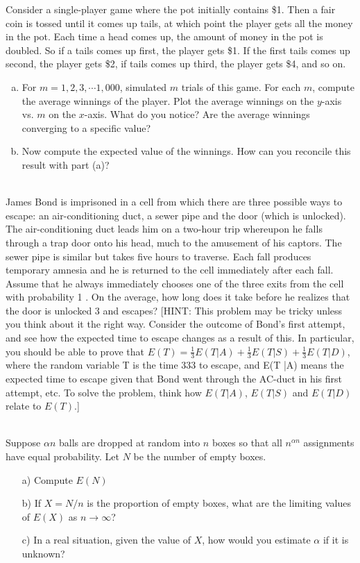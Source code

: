\documentclass[]{article}
\begin{document}
\begin{qunlist}

Consider a single-player game where the pot initially contains \$1. Then a fair coin is tossed until it comes up tails, at which point the player gets all the money in the pot. Each time a head comes up, the amount of money in the pot is doubled.  So if a tails comes up first, the player gets \$1.  If the first tails comes up second, the player gets \$2, if tails comes up third, the player gets \$4, and so on.

\begin{enumerate}[a)]

\qpart
\item For $m=1,2,3, \cdots 1,000$, simulated $m$ trials of this game.  For each $m$, compute the average winnings of the player.  Plot the average winnings on the $y$-axis vs. $m$ on the $x$-axis.  What do you notice?  Are the average winnings converging to a specific value?

\qpart
\item Now compute the expected value of the winnings.  How can you reconcile this result with part (a)?
\end{enumerate}


 \\
James Bond is imprisoned in a cell from which there are three possible ways to escape: an air-conditioning
duct, a sewer pipe and the door (which is unlocked). The air-conditioning duct leads him on a two-hour trip
whereupon he falls through a trap door onto his head, much to the amusement of his captors. The sewer pipe
is similar but takes five hours to traverse. Each fall produces temporary amnesia and he is returned to the
cell immediately after each fall. Assume that he always immediately chooses one of the three exits from the
cell with probability 1 . On the average, how long does it take before he realizes that the door is unlocked 3
and escapes?
[HINT: This problem may be tricky unless you think about it the right way. Consider the outcome of Bond's
first attempt, and see how the expected time to escape changes as a result of this. In particular, you should
be able to prove that $E(T) = \frac{1}{3}E(T|A) + \frac{1}{3}E(T|S) + \frac{1}{3}E(T|D)$, where the random variable T is the time 333
to escape, and E(T |A) means the expected time to escape given that Bond went through the AC-duct in his first attempt, etc. To solve the problem, think how $E(T |A)$, $E(T |S)$ and $E(T |D)$ relate to $E(T )$.]

\\
Suppose $\alpha n$ balls are dropped at random into $n$ boxes so that all $n^{\alpha n}$ assignments have equal probability. Let $N$ be the number of empty boxes.
\begin{itemize}
\item[a)] Compute $E(N)$
\item[b)] If $X=N/n$ is the proportion of empty boxes, what are the limiting values of $E(X)$ as $n \rightarrow \infty$?
\item[c)] In a real situation, given the value of $X$, how would you estimate $\alpha$ if it is unknown?
\end{itemize}




\end{qunlist}
\end{document}
